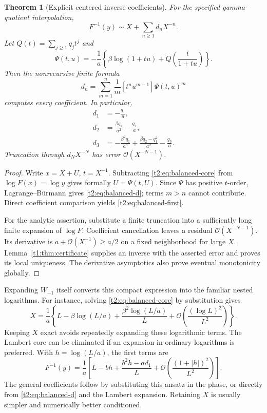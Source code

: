 \documentclass[11pt,openany]{book}
\numberwithin{equation}{chapter}
\theoremstyle{plain}
\newtheorem{theorem}{Theorem}[chapter]
\theoremstyle{definition}
\theoremstyle{remark}
\newcommand{\OO}{\mathcal O}\newcommand{\bigO}{\mathcal O}
\begin{document}
\begin{theorem}[Explicit centered inverse coefficients]
\label{t2:thm:balanced-inverse}
For the specified gamma-quotient interpolation,
\begin{equation}
 F^{-1}(y)\sim X+\sum_{n\ge1}d_nX^{-n}.
 \label{t2:eq:balanced-inverse}
\end{equation}
Let $Q(t)=\sum_{j\ge1}q_jt^j$ and
\[
 \Psi(t,u)=-\frac1a\left\{\beta\log(1+tu)
                     +Q\!\left(\frac{t}{1+tu}\right)\right\}.
\]
Then the nonrecursive finite formula
\begin{equation}
 d_n=\sum_{m=1}^n\frac1m[t^nu^{m-1}]\Psi(t,u)^m
 \label{t2:eq:balanced-d}
\end{equation}
computes every coefficient. In particular,
\begin{align}
 d_1&=-\frac{q_1}{a},\nonumber\\
 d_2&=\frac{\beta q_1}{a^2}-\frac{q_2}{a},\nonumber\\
 d_3&=-\frac{\beta^2q_1}{a^3}
       +\frac{\beta q_2-q_1^2}{a^2}-\frac{q_3}{a}.
 \label{t2:eq:balanced-first}
\end{align}
Truncation through $d_NX^{-N}$ has error $\bigO(X^{-N-1})$.
\end{theorem}
\begin{proof}
Write $x=X+U$, $t=X^{-1}$. Subtracting \eqref{t2:eq:balanced-core} from $\log F(x)=\log y$ gives formally $U=\Psi(t,U)$. Since $\Psi$ has positive $t$-order, Lagrange--B\"urmann gives \eqref{t2:eq:balanced-d}; terms $m>n$ cannot contribute. Direct coefficient comparison yields \eqref{t2:eq:balanced-first}.

For the analytic assertion, substitute a finite truncation into a sufficiently long finite expansion of $\log F$. Coefficient cancellation leaves a residual $\bigO(X^{-N-1})$. Its derivative is $a+\bigO(X^{-1})\ge a/2$ on a fixed neighborhood for large $X$. Lemma~\ref{t1:thm:certificate} supplies an inverse with the asserted error and proves its local uniqueness. The derivative asymptotics also prove eventual monotonicity globally.
\end{proof}

Expanding $W_{-1}$ itself converts this compact expression into the familiar nested logarithms. For instance, solving \eqref{t2:eq:balanced-core} by substitution gives
\[
 X=\frac1a\left\{L-\beta\log(L/a)
          +\frac{\beta^2\log(L/a)}{L}
          +\bigO\!\left(\frac{(\log L)^2}{L^2}\right)\right\}.
\]
Keeping $X$ exact avoids repeatedly expanding these logarithmic terms.
The Lambert core can be eliminated if an expansion in ordinary logarithms is preferred. With $h=\log(L/a)$, the first terms are
\begin{equation}
 F^{-1}(y)=\frac1a\left[
 L-bh+\frac{b^2h-ad_1}{L}
 +\OO\!\left(\frac{(1+|h|)^2}{L^2}\right)\right].
 \label{t1:eq:flatten}
\end{equation}
The general coefficients follow by substituting this ansatz in the phase, or directly from \eqref{t2:eq:balanced-d} and the Lambert expansion. Retaining $X$ is usually simpler and numerically better conditioned.
\end{document}
